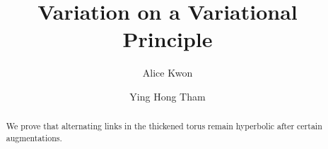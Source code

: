 \documentclass{amsart}
\begin{document}
\title{Variation on a Variational Principle}
\author{Alice Kwon}
   \address{TODO SUNY Maritime address}
\author{Ying Hong Tham}
   \address{Department of Mathematics, Stony Brook University, 
            Stony Brook, NY 11794, USA}

\begin{abstract}
We prove that alternating links in the thickened torus remain hyperbolic
after certain augmentations.
\end{abstract}
\maketitle




\end{document}

